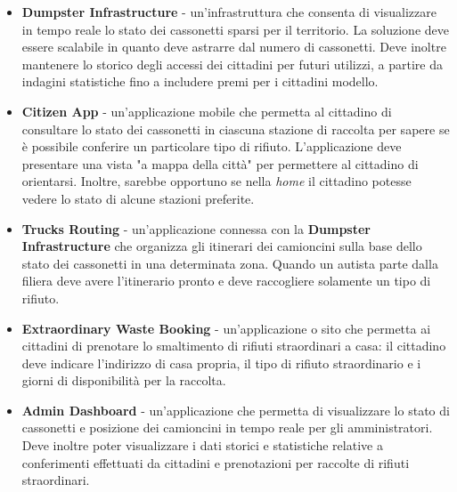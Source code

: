 \begin{itemize}
    \item \textbf{Dumpster Infrastructure} - un'infrastruttura che consenta di visualizzare in tempo reale lo stato dei
    cassonetti sparsi per il territorio. La soluzione deve essere scalabile in quanto deve astrarre dal numero di cassonetti.
    Deve inoltre mantenere lo storico degli accessi dei cittadini per futuri utilizzi, a partire da indagini statistiche fino
    a includere premi per i cittadini modello.
    \item \textbf{Citizen App} - un'applicazione mobile che permetta al cittadino di consultare lo stato dei cassonetti in
    ciascuna stazione di raccolta per sapere se è possibile conferire un particolare tipo di rifiuto. L'applicazione deve
    presentare una vista "a mappa della città" per permettere al cittadino di orientarsi. Inoltre, sarebbe opportuno se
    nella \textit{home} il cittadino potesse vedere lo stato di alcune stazioni preferite.
    \item \textbf{Trucks Routing} - un'applicazione connessa con la \textbf{Dumpster Infrastructure} che organizza gli
    itinerari dei camioncini sulla base dello stato dei cassonetti in una determinata zona. Quando un autista parte dalla
    filiera deve avere l'itinerario pronto e deve raccogliere solamente un tipo di rifiuto.
    \item \textbf{Extraordinary Waste Booking} - un'applicazione o sito che permetta ai cittadini di prenotare lo
    smaltimento di rifiuti straordinari a casa: il cittadino deve indicare l'indirizzo di casa propria, il tipo di rifiuto
    straordinario e i giorni di disponibilità per la raccolta.
    \item \textbf{Admin Dashboard} - un'applicazione che permetta di visualizzare lo stato di cassonetti e posizione dei
    camioncini in tempo reale per gli amministratori. Deve inoltre poter visualizzare i dati storici e statistiche relative
    a conferimenti effettuati da cittadini e prenotazioni per raccolte di rifiuti straordinari.
\end{itemize}